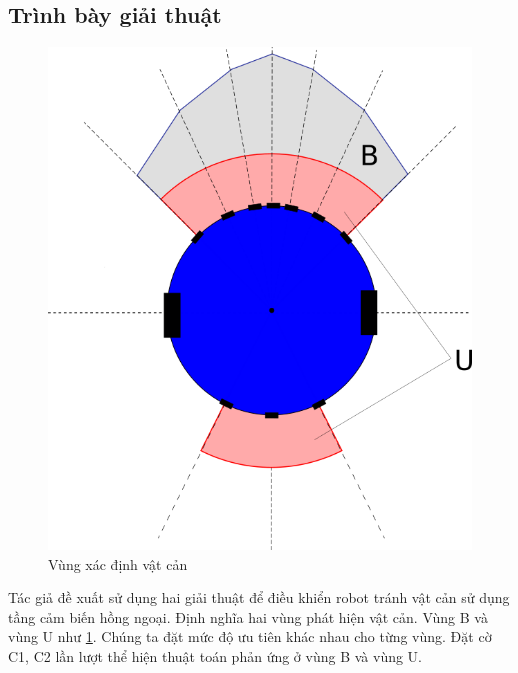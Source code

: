 \subsection{Trình bày giải thuật}

\begin{figure}[htbp]
    \centering
    \includegraphics[width=0.5\linewidth]{figures/arg_obstacle-detection-area.png}
    \caption{Vùng xác định vật cản}
    \label{fig:arg-obstacle-area}
\end{figure}

Tác giả đề xuất sử dụng hai giải thuật để điều khiển robot tránh vật cản sử dụng tầng cảm biến hồng ngoại. Định nghĩa hai vùng phát hiện vật cản. Vùng B và vùng U như \figurename{ \ref{fig:arg-obstacle-area}}. Chúng ta đặt mức độ ưu tiên khác nhau cho từng vùng. Đặt cờ C1, C2 lần lượt thể hiện thuật toán phản ứng ở vùng B và vùng U.

